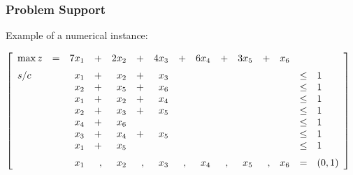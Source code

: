 \documentclass[]{beamer}
\begin{document}
%
%

\begin{frame}
  \frametitle{Problem Support}
\vspace{-4mm}

Example of a numerical instance:
\vspace{3mm}

{\scriptsize
\begin{center}
$
\left [
\begin{array}{lcrrrrrrrrrrrrllll}
%
   \max z & =  & 7x_1 &+& 2 x_2 &+& 4 x_3 &+&  6 x_4 &+& 3 x_5 &+& x_6 \vspace{2mm}\\	

%
  s/c  & &  x_1 &+&  x_2 &+&  x_3  && && && & \le & 1   \\
         & &  x_2 &+&  x_5 &+&  x_6  & &&&&&&\le & 1   \\
         & &  x_1 &+&  x_2 &+& x_4  && &&&& & \le & 1  \\
         & &  x_2 &+&  x_3 &+&  x_5 && &&&&& \le & 1  \\
         & &  x_4 &+&  x_6 &&&           &&&&  && \le & 1  \\
         & &  x_3 &+&  x_4 &+&  x_5 &&&&&& & \le & 1  \\
         & &  x_1 &+&  x_5  && &&          &&&  && \le & 1  \vspace{2mm} \\

  & &  x_1&,& x_2&,& x_3&,& x_4&,& x_5&,& x_6 & = &(0,1)\\

\end{array}
\right ]
$ 
\end{center}
}

\end{frame}
\end{document}
